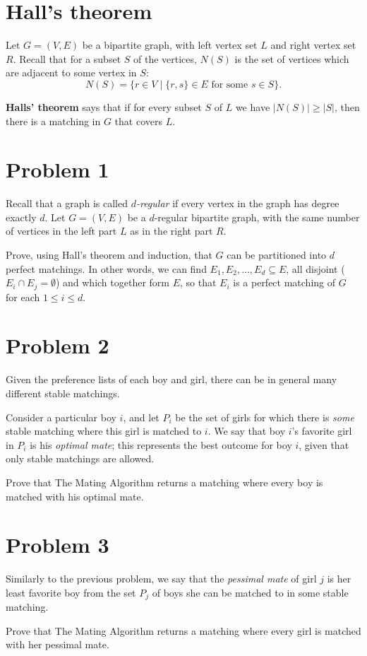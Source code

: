\documentclass[12pt]{article}
\begin{document}



\section*{Hall's theorem}

Let $G=(V,E)$ be a bipartite graph, with left vertex set $L$ and right vertex set $R$.
Recall that for a subset $S$ of the vertices, $N(S)$ is the set of vertices which are adjacent to some vertex in $S$:
\[ N(S) = \{ r \in V \mid \{r, s\} \in E \text{ for some } s \in S \}. \]

\textbf{Halls' theorem} says that if for every subset $S$ of $L$ we have $|N(S)| \geq |S|$, then there is a matching in $G$ that covers $L$.

\section*{Problem 1}

Recall that a graph is called \emph{$d$-regular} if every vertex in the graph has degree exactly $d$.
Let $G=(V,E)$ be a $d$-regular bipartite graph, with the same number of vertices in the left part $L$ as in the right part $R$.

Prove, using Hall's theorem and induction, that $G$ can be partitioned into $d$ perfect matchings. In other words, we can find $E_1, E_2, \ldots, E_d \subseteq E$, all disjoint ($E_i \cap E_j = \emptyset$) and which together form $E$, so that $E_i$ is a perfect matching of $G$ for each $1 \leq i \leq d$.

\section*{Problem 2}

Given the preference lists of each boy and girl, there can be in general many different stable matchings.

Consider a particular boy $i$, and let $P_i$ be the set of girls for which there is \emph{some} stable matching where this girl is matched to $i$.
We say that boy $i$'s favorite girl in $P_i$ is his \emph{optimal mate}; this represents the best outcome for boy $i$, given that only stable matchings are allowed.

Prove that The Mating Algorithm returns a matching where every boy is matched with his optimal mate.


\section*{Problem 3}
Similarly to the previous problem, we say that the \emph{pessimal mate} of girl $j$ is her least favorite boy from the set $P_j$ of boys she can be matched to in some stable matching. 

Prove that The Mating Algorithm returns a matching where every girl is matched with her pessimal mate.
\end{document}
